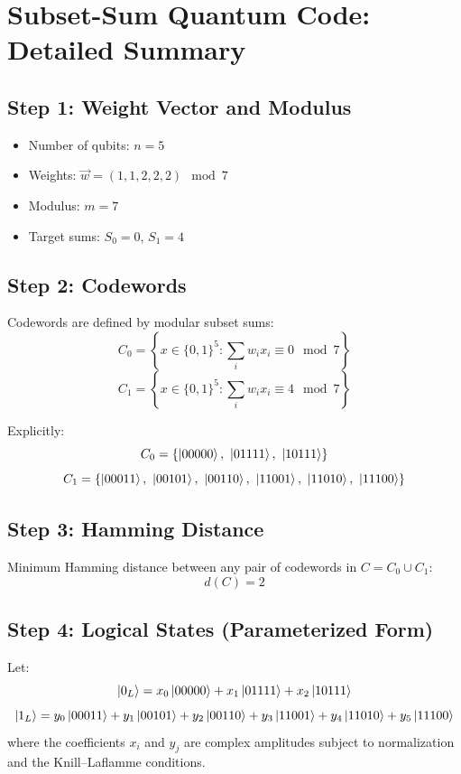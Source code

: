 \documentclass{article}
\begin{document}
\section*{Subset-Sum Quantum Code: Detailed Summary}

\subsection*{Step 1: Weight Vector and Modulus}

\begin{itemize}
  \item Number of qubits: \( n = 5 \)
  \item Weights: \( \vec{w} = (1,1,2,2,2) \mod 7 \)
  \item Modulus: \( m = 7 \)
  \item Target sums: \( S_0 = 0 \), \( S_1 = 4 \)
\end{itemize}

\subsection*{Step 2: Codewords}

Codewords are defined by modular subset sums:
\[
C_0 = \left\{ x \in \{0,1\}^5 : \sum_i w_i x_i \equiv 0 \mod 7 \right\}
\]
\[
C_1 = \left\{ x \in \{0,1\}^5 : \sum_i w_i x_i \equiv 4 \mod 7 \right\}
\]

Explicitly:
\[
C_0 = \{\ket{00000},\ \ket{01111},\ \ket{10111} \}
\]
\[
C_1 = \{\ket{00011},\ \ket{00101},\ \ket{00110},\ \ket{11001},\ \ket{11010},\ \ket{11100} \}
\]

\subsection*{Step 3: Hamming Distance}

Minimum Hamming distance between any pair of codewords in \( C = C_0 \cup C_1 \):
\[
d(C) = 2
\]

\subsection*{Step 4: Logical States (Parameterized Form)}

Let:
\[
\ket{0_L} = x_0 \ket{00000} + x_1 \ket{01111} + x_2 \ket{10111}
\]
\[
\ket{1_L} = y_0 \ket{00011} + y_1 \ket{00101} + y_2 \ket{00110} + y_3 \ket{11001} + y_4 \ket{11010} + y_5 \ket{11100}
\]
where the coefficients \( x_i \) and \( y_j \) are complex amplitudes subject to normalization and the Knill--Laflamme conditions.
\end{document}
